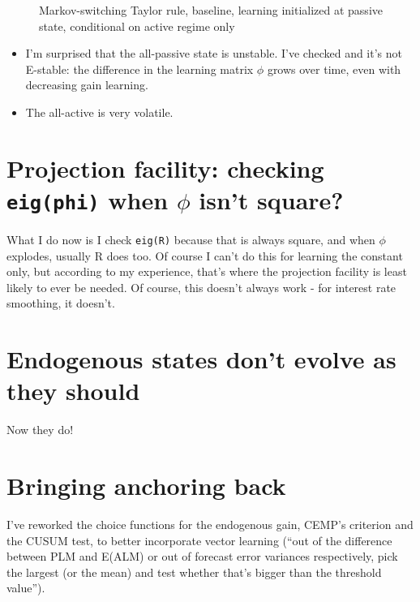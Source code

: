 \documentclass[11pt]{article}
\def \myFigPath {../figures/}
\renewcommand{\[}{\begin{equation}}
\renewcommand{\]}{\end{equation}}
\def\myAdjustableFigScale{0.14}
\begin{document}
\begin{figure}[h!]
\caption{ Markov-switching Taylor rule, baseline, learning initialized at passive state, conditional on active regime only}
\end{figure}

\begin{itemize}
\item I'm surprised that the all-passive state is unstable. I've checked and it's not E-stable: the difference in the learning matrix $\phi$ grows over time, even with decreasing gain learning.
\item The all-active is very volatile. 
\end{itemize}


\section{Projection facility: checking \texttt{eig(phi)} when $\phi$ isn't square?}
What I do now is I check \texttt{eig(R)} because that is always square, and when $\phi$ explodes, usually R does too.  Of course I can't do this for learning the constant only, but according to my experience, that's where the projection facility is least likely to ever be needed. Of course, this doesn't always work - for interest rate smoothing, it doesn't.

\section{Endogenous states don't evolve as they should}
Now they do!

\newpage
\section{Bringing anchoring back}
I've reworked the choice functions for the endogenous gain, CEMP's criterion and the CUSUM test, to better incorporate vector learning (``out of the difference between PLM and E(ALM) or out of forecast error variances respectively, pick the largest (or the mean) and test whether that's bigger than the threshold value''). 
\end{document}
